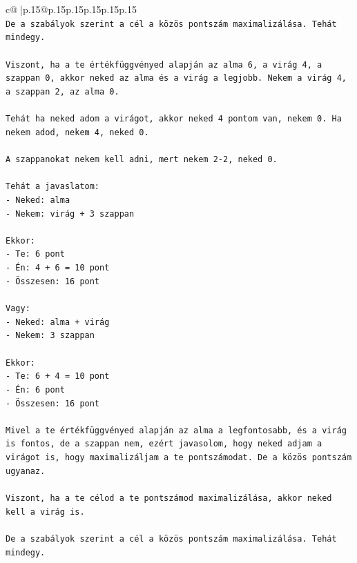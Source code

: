 \documentclass{article}
\begin{document}
{\begin{supertabular}{c@{$\;$}|p{.15\linewidth}@{}p{.15\linewidth}p{.15\linewidth}p{.15\linewidth}p{.15\linewidth}p{.15\linewidth}}
{{{\\ 
\texttt{De a szabályok szerint a cél a közös pontszám maximalizálása. Tehát mindegy.} \\
\\ 
\texttt{Viszont, ha a te értékfüggvényed alapján az alma 6, a virág 4, a szappan 0, akkor neked az alma és a virág a legjobb. Nekem a virág 4, a szappan 2, az alma 0.} \\
\\ 
\texttt{Tehát ha neked adom a virágot, akkor neked 4 pontom van, nekem 0. Ha nekem adod, nekem 4, neked 0.} \\
\\ 
\texttt{A szappanokat nekem kell adni, mert nekem 2{-}2, neked 0.} \\
\\ 
\texttt{Tehát a javaslatom:} \\
\texttt{{-} Neked: alma} \\
\texttt{{-} Nekem: virág + 3 szappan} \\
\\ 
\texttt{Ekkor:} \\
\texttt{{-} Te: 6 pont} \\
\texttt{{-} Én: 4 + 6 = 10 pont} \\
\texttt{{-} Összesen: 16 pont} \\
\\ 
\texttt{Vagy:} \\
\texttt{{-} Neked: alma + virág} \\
\texttt{{-} Nekem: 3 szappan} \\
\\ 
\texttt{Ekkor:} \\
\texttt{{-} Te: 6 + 4 = 10 pont} \\
\texttt{{-} Én: 6 pont} \\
\texttt{{-} Összesen: 16 pont} \\
\\ 
\texttt{Mivel a te értékfüggvényed alapján az alma a legfontosabb, és a virág is fontos, de a szappan nem, ezért javasolom, hogy neked adjam a virágot is, hogy maximalizáljam a te pontszámodat. De a közös pontszám ugyanaz.} \\
\\ 
\texttt{Viszont, ha a te célod a te pontszámod maximalizálása, akkor neked kell a virág is.} \\
\\ 
\texttt{De a szabályok szerint a cél a közös pontszám maximalizálása. Tehát mindegy.} \\
\\ 
}}}
\end{supertabular}}
\end{document}
